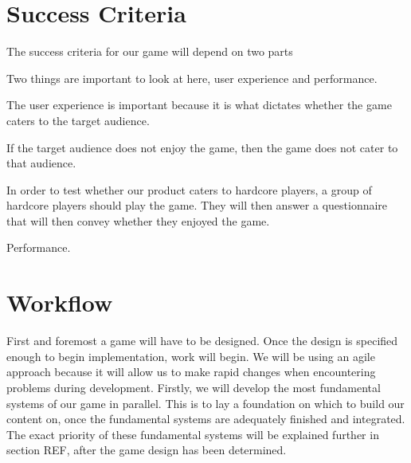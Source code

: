 \section{Success Criteria}
The success criteria for our game will depend on two parts 



Two things are important to look at here, user experience and performance.

The user experience is important because it is what dictates whether the game caters to the target audience.




If the target audience does not enjoy the game, then the game does not cater to that audience.








In order to test whether our product caters to hardcore players, a group of hardcore players should play the game.
They will then answer a questionnaire that will then convey whether they enjoyed the game.

Performance.

\section{Workflow}
First and foremost a game will have to be designed.
Once the design is specified enough to begin implementation, work will begin.
We will be using an agile approach because it will allow us to make rapid changes when encountering problems during development.
Firstly, we will develop the most fundamental systems of our game in parallel.
This is to lay a foundation on which to build our content on, once the fundamental systems are adequately finished and integrated.
The exact priority of these fundamental systems will be explained further in section  REF, after the game design has been determined.	